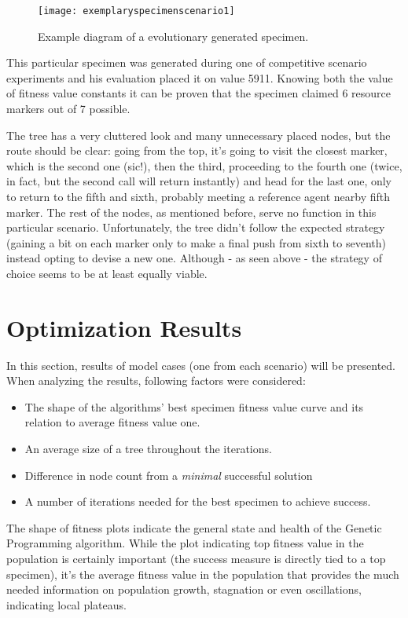 \begin{figure}[h]
    \centering
    \texttt{[image: exemplaryspecimenscenario1]}
    \caption{Example diagram of a evolutionary generated specimen.}
    \label{fig:x exemplaryspecimenscenario1}
\end{figure}

This particular specimen was generated during one of competitive scenario experiments and his evaluation placed it on value 5911. Knowing both the value of fitness value constants it can be proven that the specimen claimed 6 resource markers out of 7 possible.

The tree has a very cluttered look and many unnecessary placed nodes, but the route should be clear: going from the top, it's going to visit the closest marker, which is the second one (sic!), then the third, proceeding to the fourth one (twice, in fact, but the second call will return instantly) and head for the last one, only to return to the fifth and sixth, probably meeting a reference agent nearby fifth marker. The rest of the nodes, as mentioned before, serve no function in this particular scenario. Unfortunately, the tree didn't follow the expected strategy (gaining a bit on each marker only to make a final push from sixth to seventh) instead opting to devise a new one. Although - as seen above - the strategy of choice seems to be at least equally viable.
\section{Optimization Results}
In this section, results of model cases (one from each scenario) will be presented. When analyzing the results, following factors were considered:
\begin{itemize}
    \item The shape of the algorithms' best specimen fitness value curve and its relation to average fitness value one.
    \item An average size of a tree throughout the iterations.
    \item Difference in node count from a \textit{minimal} successful solution %
    \item A number of iterations needed for the best specimen to achieve success.
\end{itemize}
The shape of fitness plots indicate the general state and health of the Genetic Programming algorithm. While the plot indicating top fitness value in the population is certainly important (the success measure is directly tied to a top specimen), it's the average fitness value in the population that provides the much needed information on population growth, stagnation or even oscillations, indicating local plateaus.

